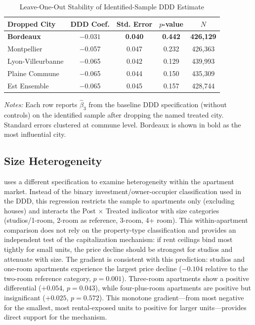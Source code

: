 \documentclass[12pt]{article}
\begin{document}
\begin{table}[H]
\centering
\caption{Leave-One-Out Stability of Identified-Sample DDD Estimate}
\label{tab:loo}
\begin{threeparttable}
\begin{tabular}{lcccc}
\toprule
Dropped City & DDD Coef. & Std. Error & $p$-value & $N$ \\
\midrule
\textbf{Bordeaux} & $\mathbf{-0.031}$ & \textbf{0.040} & \textbf{0.442} & \textbf{426,129} \\
Montpellier & $-$0.057 & 0.047 & 0.232 & 426,363 \\
Lyon-Villeurbanne & $-$0.065 & 0.042 & 0.129 & 439,993 \\
Plaine Commune & $-$0.065 & 0.044 & 0.150 & 435,309 \\
Est Ensemble & $-$0.065 & 0.045 & 0.157 & 428,744 \\
\bottomrule
\end{tabular}
\begin{tablenotes}[flushleft]
\small
\item \emph{Notes:} Each row reports $\hat{\beta}_3$ from the baseline DDD specification (without controls) on the identified sample after dropping the named treated city. Standard errors clustered at commune level. Bordeaux is shown in bold as the most influential city.
\end{tablenotes}
\end{threeparttable}
\end{table}


\subsection{Size Heterogeneity}

 uses a different specification to examine heterogeneity within the apartment market. Instead of the binary investment/owner-occupier classification used in the DDD, this regression restricts the sample to apartments only (excluding houses) and interacts the Post $\times$ Treated indicator with size categories (studios/1-room, 2-room as reference, 3-room, 4+ room). This within-apartment comparison does not rely on the property-type classification and provides an independent test of the capitalization mechanism: if rent ceilings bind most tightly for small units, the price decline should be strongest for studios and attenuate with size. The gradient is consistent with this prediction: studios and one-room apartments experience the largest price decline ($-0.104$ relative to the two-room reference category, $p = 0.001$). Three-room apartments show a positive differential ($+0.054$, $p = 0.043$), while four-plus-room apartments are positive but insignificant ($+0.025$, $p = 0.572$). This monotone gradient---from most negative for the smallest, most rental-exposed units to positive for larger units---provides direct support for the mechanism.
\end{document}
